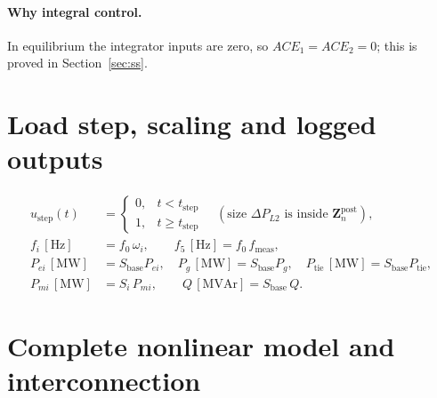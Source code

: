 \documentclass[11pt,a4paper]{article}
\numberwithin{equation}{section}
\begin{document}
\paragraph{Why integral control.} In equilibrium the integrator inputs are zero, so $ACE_1 = ACE_2 = 0$; this is proved in Section~\ref{sec:ss}.

\section{Load step, scaling and logged outputs}
\begin{align}
u_{\text{step}}(t) &= \begin{cases}0,& t<t_{\text{step}}\\1,& t\ge t_{\text{step}}\end{cases}
\quad(\text{size } \Delta P_{L2} \text{ is inside } \bm Z_n^{\text{post}}),\\
f_i\,[\text{Hz}] &= f_0\,\omega_i,\qquad f_{5}\,[\text{Hz}] = f_0\,f_{\text{meas}},\\
P_{ei}\,[\text{MW}] &= S_{\text{base}}P_{ei},\quad P_g\,[\text{MW}] = S_{\text{base}}P_g,\quad P_{\text{tie}}\,[\text{MW}] = S_{\text{base}}P_{\text{tie}},\\
P_{mi}\,[\text{MW}] &= S_i\,P_{mi},\qquad Q\,[\text{MVAr}] = S_{\text{base}}\,Q .
\end{align}

\section{Complete nonlinear model and interconnection}
\end{document}
